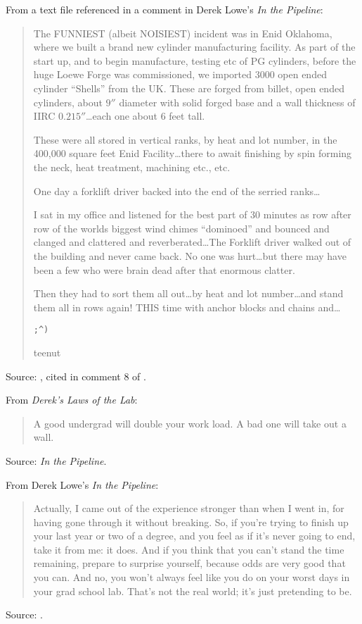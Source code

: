 \documentclass[a4paper]{article}
\begin{document}
From a text file referenced in a comment in Derek Lowe's {\it In the Pipeline}:
\begin{quote}
	The FUNNIEST (albeit NOISIEST) incident was in Enid Oklahoma, where we built a
	brand new cylinder manufacturing facility.  As part of the start up, and to
	begin manufacture, testing etc of PG cylinders, before the huge Loewe Forge was
	commissioned, we imported 3000 open ended cylinder ``Shells'' from the UK.  These
	are forged from billet, open ended cylinders, about $9''$ diameter with solid
	forged base and a wall thickness of IIRC $0.215''$\ldots each one about 6 feet tall.

	These were all stored in vertical ranks, by heat and lot number, in the 400,000
	square feet Enid Facility\ldots there to await finishing by spin forming the neck,
	heat treatment, machining etc., etc.

	One day a forklift driver backed into the end of the serried ranks\ldots

	I sat in my office and listened for the best part of 30 minutes as row after row
	of the worlds biggest wind chimes ``dominoed'' and bounced and clanged and
	clattered and reverberated\ldots The Forklift driver walked out of the building and
	never came back.  No one was hurt\ldots but there may have been a few who were brain
	dead after that enormous clatter.

	Then they had to sort them all out\ldots by heat and lot
	number\ldots and stand them all in rows again!  THIS time with
	anchor blocks and chains and\ldots

	\verb,;^),

	teenut
\end{quote}
Source: \citet{Bastow1999}, cited in comment 8 of \citet{Lowe2004}.
\medskip

From {\it Derek's Laws of the Lab}:
\begin{quote}
	A good undergrad will double your work load. A bad one will
	take out a wall.
\end{quote}
Source: {\it In the Pipeline}.
\medskip

From Derek Lowe's {\it In the Pipeline}:
\begin{quote}
	Actually, I came out of the experience stronger than when I
	went in, for having gone through it without breaking. So, if
	you're trying to finish up your last year or two of a degree,
	and you feel as if it's never going to end, take it from me: it
	does. And if you think that you can't stand the time remaining,
	prepare to surprise yourself, because odds are very good that
	you can. And no, you won't always feel like you do on your
	worst days in your grad school lab. That's not the real world;
	it's just pretending to be.
\end{quote}
Source: \citet{Lowe2007}.
\medskip
\end{document}
